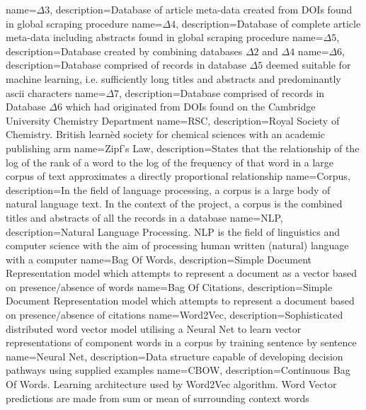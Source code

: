 {
name={$\Delta3$},
description={Database of article meta-data created from DOIs found in global scraping procedure} 
} 
{
name={$\Delta4$},
description={Database of complete article meta-data including abstracts found in global scraping procedure} 
}
{
name={$\Delta5$},
description={Database created by combining databases $\Delta2$ and $\Delta4$} 
}
{
name={$\Delta6$},
description={Database comprised of records in database $\Delta5$ deemed suitable for machine learning, i.e.  sufficiently long titles and abstracts and predominantly ascii characters} 
}
{
name={$\Delta7$},
description={Database comprised of records in Database $\Delta6$ which had originated from DOIs found on the Cambridge University Chemistry Department} 
}
{
name={RSC},
description={Royal Society of Chemistry. British learn\`ed society for chemical sciences with an academic publishing arm} 
}
{
name={Zipf's Law},
description={States that the relationship of the log of the rank of a word to the log of the frequency of that word in a large corpus of text approximates a directly proportional relationship \cite{zipf}} 
}
{
name={Corpus},
description={In the field of language processing, a corpus is a large body of natural language text. In the context of the project, a corpus is the combined titles and abstracts of all the records in a database} 
}
{
name={NLP},
description={Natural Language Processing. NLP is the field of linguistics and computer science with the aim of processing human written (natural) language with a computer} 
}
{
name={Bag Of Words},
description={Simple Document Representation model which attempts to represent a document as a vector based on presence/absence of words} 
}
{
name={Bag Of Citations},
description={Simple Document Representation model which attempts to represent a document based on presence/absence of citations} 
}
{
name={Word2Vec},
description={Sophisticated distributed word vector model utilising a Neural Net to learn vector representations of  component words in a corpus by training sentence by sentence \cite{word2vec1}\cite{word2vec2}  } 
}
{
name={Neural Net},
description={Data structure capable of developing decision pathways using supplied examples} 
}
{
name={CBOW},
description={Continuous Bag Of Words. Learning architecture used by Word2Vec algorithm. Word Vector predictions are made from sum or mean of surrounding context words} 
}
